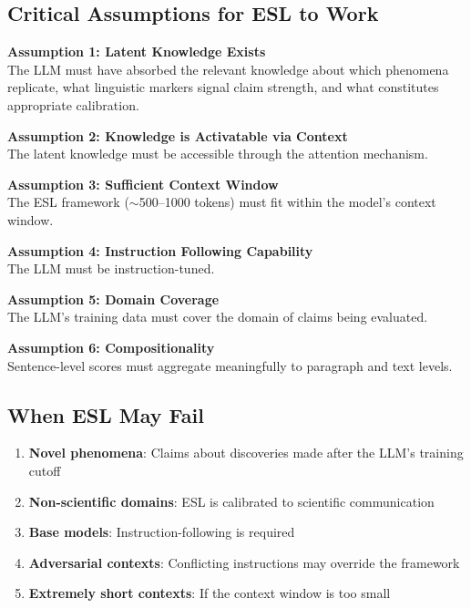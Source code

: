 \documentclass[11pt,a4paper]{article}
\begin{document}
\subsection{Critical Assumptions for ESL to Work}

\begin{assumptionbox}
\textbf{Assumption 1: Latent Knowledge Exists}\\
The LLM must have absorbed the relevant knowledge about which phenomena replicate, what linguistic markers signal claim strength, and what constitutes appropriate calibration.

\textbf{Assumption 2: Knowledge is Activatable via Context}\\
The latent knowledge must be accessible through the attention mechanism.

\textbf{Assumption 3: Sufficient Context Window}\\
The ESL framework ($\sim$500--1000 tokens) must fit within the model's context window.

\textbf{Assumption 4: Instruction Following Capability}\\
The LLM must be instruction-tuned.

\textbf{Assumption 5: Domain Coverage}\\
The LLM's training data must cover the domain of claims being evaluated.

\textbf{Assumption 6: Compositionality}\\
Sentence-level scores must aggregate meaningfully to paragraph and text levels.
\end{assumptionbox}


\subsection{When ESL May Fail}

\begin{enumerate}
    \item \textbf{Novel phenomena}: Claims about discoveries made after the LLM's training cutoff
    \item \textbf{Non-scientific domains}: ESL is calibrated to scientific communication
    \item \textbf{Base models}: Instruction-following is required
    \item \textbf{Adversarial contexts}: Conflicting instructions may override the framework
    \item \textbf{Extremely short contexts}: If the context window is too small
\end{enumerate}
\end{document}
